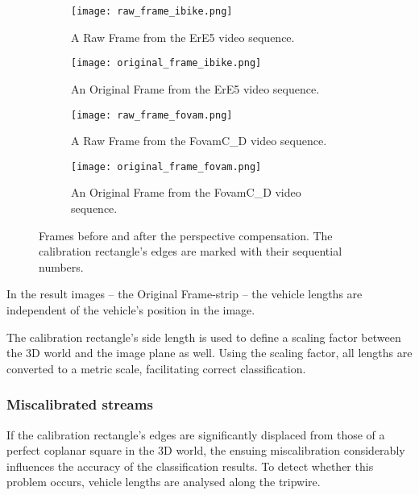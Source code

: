\begin{figure}[!t]
	\centering
		\begin{subfigure}[b]{0.4\textwidth}
			\texttt{[image: raw\_frame\_ibike.png]}
			\caption{A Raw Frame from the ErE5 video sequence.}
		\end{subfigure}
		\quad
		\begin{subfigure}[b]{0.4\textwidth}
			\texttt{[image: original\_frame\_ibike.png]}
			\caption{An Original Frame from the ErE5 video sequence.}
		\end{subfigure}
		\hfill
		\begin{subfigure}[b]{0.4\textwidth}
			\texttt{[image: raw\_frame\_fovam.png]}
			\caption{A Raw Frame from the FovamC\_D video sequence.}
		\end{subfigure}
		\quad
		\begin{subfigure}[b]{0.4\textwidth}
			\texttt{[image: original\_frame\_fovam.png]}
			\caption{An Original Frame from the FovamC\_D video sequence.}
		\end{subfigure}
		
		\caption{Frames before and after the perspective compensation. The calibration rectangle's edges are marked with their sequential numbers.\label{fig:perscomp}}
\end{figure}

In the result images -- the Original Frame-strip -- the vehicle lengths are independent of the vehicle's position in the image. 

The calibration rectangle's side length is used to define a scaling factor between the 3D world and the image plane as well.
Using the scaling factor, all lengths are converted to a metric scale, facilitating correct classification.

\subsubsection{Miscalibrated streams}
If the calibration rectangle's edges are significantly displaced from those of a perfect coplanar square in the 3D world, the ensuing miscalibration considerably influences the accuracy of the classification results.
To detect whether this problem occurs, vehicle lengths are analysed along the tripwire.

